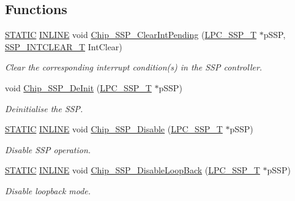 \subsection*{Functions}
\begin{DoxyCompactItemize}
\item 
\hyperlink{group__LPC__Types__Public__Macros_ga10b2d890d871e1489bb02b7e70d9bdfb}{S\+T\+A\+T\+IC} \hyperlink{group__LPC__Types__Public__Types_ga2eb6f9e0395b47b8d5e3eeae4fe0c116}{I\+N\+L\+I\+NE} void \hyperlink{group__SSP__17XX__40XX_ga5fe8047a36b3055251cff755d339ca4a}{Chip\+\_\+\+S\+S\+P\+\_\+\+Clear\+Int\+Pending} (\hyperlink{structLPC__SSP__T}{L\+P\+C\+\_\+\+S\+S\+P\+\_\+T} $\ast$p\+S\+SP, \hyperlink{group__SSP__17XX__40XX_gadc98b69a8cb7a5afef8dd81bebbfc66d}{S\+S\+P\+\_\+\+I\+N\+T\+C\+L\+E\+A\+R\+\_\+T} Int\+Clear)
\begin{DoxyCompactList}\small\item\em Clear the corresponding interrupt condition(s) in the S\+SP controller. \end{DoxyCompactList}\item 
void \hyperlink{group__SSP__17XX__40XX_ga48f87506f2fddc1043606eae292b6f16}{Chip\+\_\+\+S\+S\+P\+\_\+\+De\+Init} (\hyperlink{structLPC__SSP__T}{L\+P\+C\+\_\+\+S\+S\+P\+\_\+T} $\ast$p\+S\+SP)
\begin{DoxyCompactList}\small\item\em Deinitialise the S\+SP. \end{DoxyCompactList}\item 
\hyperlink{group__LPC__Types__Public__Macros_ga10b2d890d871e1489bb02b7e70d9bdfb}{S\+T\+A\+T\+IC} \hyperlink{group__LPC__Types__Public__Types_ga2eb6f9e0395b47b8d5e3eeae4fe0c116}{I\+N\+L\+I\+NE} void \hyperlink{group__SSP__17XX__40XX_ga3033c296868595a01dd74ecccaed6090}{Chip\+\_\+\+S\+S\+P\+\_\+\+Disable} (\hyperlink{structLPC__SSP__T}{L\+P\+C\+\_\+\+S\+S\+P\+\_\+T} $\ast$p\+S\+SP)
\begin{DoxyCompactList}\small\item\em Disable S\+SP operation. \end{DoxyCompactList}\item 
\hyperlink{group__LPC__Types__Public__Macros_ga10b2d890d871e1489bb02b7e70d9bdfb}{S\+T\+A\+T\+IC} \hyperlink{group__LPC__Types__Public__Types_ga2eb6f9e0395b47b8d5e3eeae4fe0c116}{I\+N\+L\+I\+NE} void \hyperlink{group__SSP__17XX__40XX_gaa733ed4b0773cda022ad87ff41304c40}{Chip\+\_\+\+S\+S\+P\+\_\+\+Disable\+Loop\+Back} (\hyperlink{structLPC__SSP__T}{L\+P\+C\+\_\+\+S\+S\+P\+\_\+T} $\ast$p\+S\+SP)
\begin{DoxyCompactList}\small\item\em Disable loopback mode. \end{DoxyCompactList}\item 

\end{DoxyCompactItemize}
